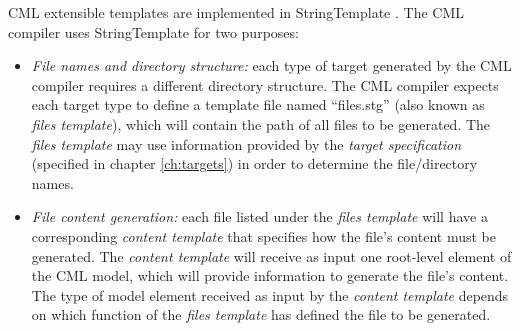 CML extensible templates are implemented in StringTemplate \cite{st}.  The CML compiler uses StringTemplate for two purposes:

\begin{itemize}
\item \emph{File names and directory structure:}
each type of target generated by the CML compiler requires a different directory structure.
The CML compiler expects each target type to define a template file named ``files.stg'' (also known as \emph{files template}),
which will contain the path of all files to be generated. The \emph{files template} may use information provided by the \emph{target specification} (specified in chapter \ref{ch:targets}) in order to determine the file/directory names.
\item \emph{File content generation:}
each file listed under the \emph{files template} will have a corresponding \emph{content template} that specifies how the file's content must be generated. The \emph{content template} will receive as input one root-level element of the CML model, which will provide information to generate the file's content. The type of model element received as input by the \emph{content template} depends on which function of the \emph{files template} has defined the file to be generated.
\end{itemize}

